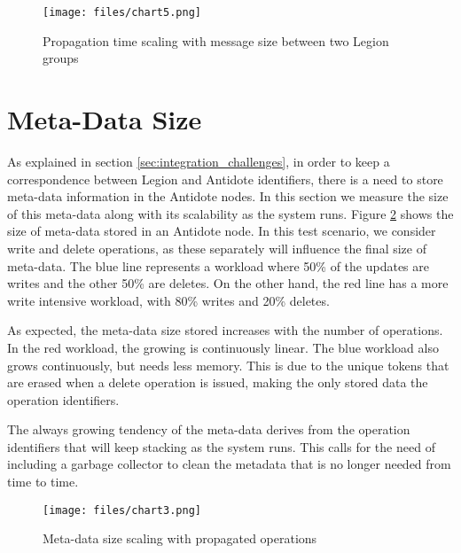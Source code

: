 \begin{figure}[h]
\centering
\texttt{[image: files/chart5.png]}
\caption{Propagation time scaling with message size between two Legion groups}
\label{chart5}
\end{figure}

\section{Meta-Data Size}
\label{sec:meta-data_size}
As explained in section \ref{sec:integration_challenges}, in order to keep a correspondence between Legion and Antidote identifiers, there is a need to store meta-data information in the Antidote nodes. In this section we measure the size of this meta-data along with its scalability as the system runs. Figure \ref{chart3} shows the size of meta-data stored in an Antidote node. In this test scenario, we consider write and delete operations, as these separately will influence the final size of meta-data. The blue line represents a workload where 50\% of the updates are writes and the other 50\% are deletes. On the other hand, the red line has a more write intensive workload, with 80\% writes and 20\% deletes.\par
	As expected, the meta-data size stored increases with the number of operations. In the red workload, the growing is continuously linear. The blue workload also grows continuously, but needs less memory. This is due to the unique tokens that are erased when a delete operation is issued, making the only stored data the operation identifiers.\par
	The always growing tendency of the meta-data derives from the operation identifiers that will keep stacking as the system runs. This calls for the need of including a garbage collector to clean the metadata that is no longer needed from time to time.

\begin{figure}[H]
\centering
\texttt{[image: files/chart3.png]}
\caption{Meta-data size scaling with propagated operations}
\label{chart3}
\end{figure}

